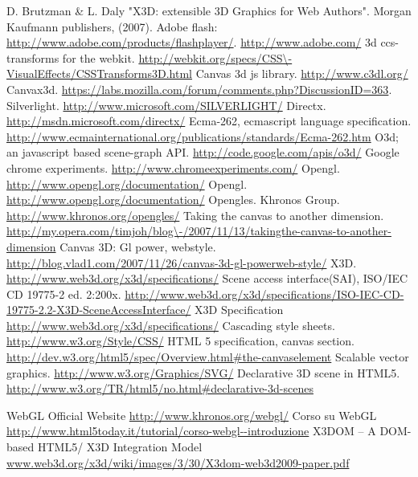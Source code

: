  D. Brutzman \& L. Daly "X3D: extensible 3D Graphics for Web Authors". Morgan Kaufmann publishers, (2007).
 Adobe flash: \url{http://www.adobe.com/products/flashplayer/}.
 \url{http://www.adobe.com/}
 3d ccs-transforms for the webkit. \url{http://webkit.org/specs/CSS\-VisualEffects/CSSTransforms3D.html}
 Canvas 3d js library. \url{http://www.c3dl.org/}
 Canvax3d. \url{https://labs.mozilla.com/forum/comments.php?DiscussionID=363}.
 Silverlight. \url{http://www.microsoft.com/SILVERLIGHT/}
 Directx. \url{http://msdn.microsoft.com/directx/}
 Ecma-262, ecmascript language specification. \url{http://www.ecmainternational.org/publications/standards/Ecma-262.htm}
 O3d; an javascript based scene-graph API. \url{http://code.google.com/apis/o3d/}
 Google chrome experiments. \url{http://www.chromeexperiments.com/}
 Opengl. \url{http://www.opengl.org/documentation/}
 Opengl. \url{http://www.opengl.org/documentation/}
 Opengles. Khronos Group. \url{http://www.khronos.org/opengles/}
 Taking the canvas to another dimension. \url{http://my.opera.com/timjoh/blog\-/2007/11/13/takingthe-canvas-to-another-dimension}
 Canvas 3D: Gl power, webstyle. \url{http://blog.vlad1.com/2007/11/26/canvas-3d-gl-powerweb-style/}
 X3D. \url{http://www.web3d.org/x3d/specifications/}
 Scene access interface(SAI), ISO/IEC CD 19775-2 ed. 2:200x. \url{http://www.web3d.org/x3d/specifications/ISO-IEC-CD-19775-2.2-X3D-SceneAccessInterface/}
 X3D Specification \url{http://www.web3d.org/x3d/specifications/}
 Cascading style sheets. \url{http://www.w3.org/Style/CSS/}
 HTML 5 specification, canvas section. \url{http://dev.w3.org/html5/spec/Overview.html\#the-canvaselement}
 Scalable vector graphics. \url{http://www.w3.org/Graphics/SVG/}
 Declarative 3D scene in HTML5. \url{http://www.w3.org/TR/html5/no.html\#declarative-3d-scenes}

 WebGL Official Website \url{http://www.khronos.org/webgl/}
 Corso su WebGL \url{http://www.html5today.it/tutorial/corso-webgl--introduzione}
 X3DOM – A DOM-based HTML5/ X3D Integration Model \url{www.web3d.org/x3d/wiki/images/3/30/X3dom-web3d2009-paper.pdf}

